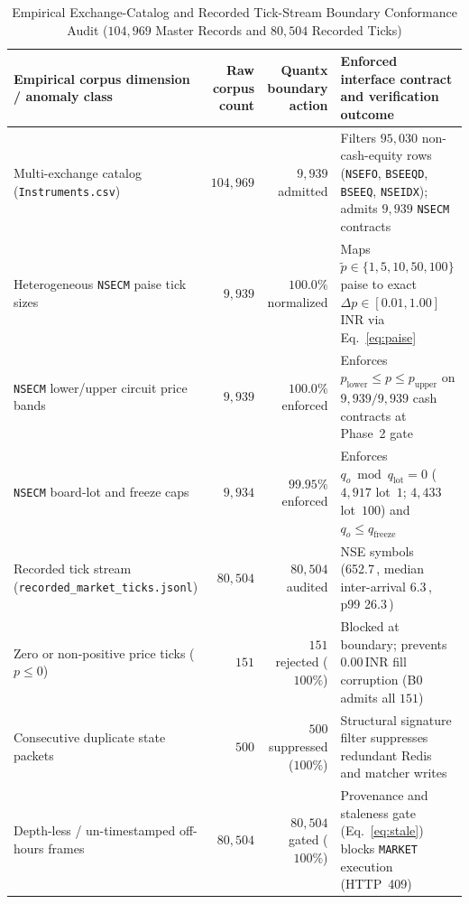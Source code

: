 \documentclass[12pt]{article}
\newcommand{\thinunit}[2]{#1\,\text{#2}}
\begin{document}
\begin{table}[!htbp]\begin{singlespace}
\caption{Empirical Exchange-Catalog and Recorded Tick-Stream Boundary Conformance Audit ($104{,}969$ Master Records and $80{,}504$ Recorded Ticks)}
\label{tab:realdata}
\centering
\small
\renewcommand{\arraystretch}{1.12}
\begin{tabularx}{\textwidth}{@{}>{\raggedright\arraybackslash}p{2.35in} r r >{\raggedright\arraybackslash}X@{}}
\toprule
Empirical corpus dimension / anomaly class & Raw corpus count & Quantx boundary action & Enforced interface contract and verification outcome \\
\midrule
Multi-exchange catalog (\texttt{Instruments.csv}) & $104{,}969$ & $9{,}939$ admitted & Filters $95{,}030$ non-cash-equity rows (\texttt{NSEFO}, \texttt{BSEEQD}, \texttt{BSEEQ}, \texttt{NSEIDX}); admits $9{,}939$ \texttt{NSECM} contracts \\
Heterogeneous \texttt{NSECM} paise tick sizes & $9{,}939$ & $100.0\%$ normalized & Maps $\tilde{p}\in\{1,5,10,50,100\}$ paise to exact $\Delta p\in[0.01,1.00]$ INR via Eq.~\eqref{eq:paise} \\
\texttt{NSECM} lower/upper circuit price bands & $9{,}939$ & $100.0\%$ enforced & Enforces $p_{\mathrm{lower}}\le p\le p_{\mathrm{upper}}$ on $9{,}939/9{,}939$ cash contracts at Phase~2 gate \\
\texttt{NSECM} board-lot and freeze caps & $9{,}934$ & $99.95\%$ enforced & Enforces $q_o\bmod q_{\mathrm{lot}}=0$ ($4{,}917$ lot~$1$; $4{,}433$ lot~$100$) and $q_o\le q_{\mathrm{freeze}}$ \\
Recorded tick stream (\texttt{recorded\_market\_ticks.jsonl}) & $80{,}504$ & $80{,}504$ audited & 100 NSE symbols (\thinunit{652.7}{s}, median inter-arrival \thinunit{6.3}{ms}, p99 \thinunit{26.3}{ms}) \\
Zero or non-positive price ticks ($p \le 0$) & $151$ & $151$ rejected ($100\%$) & Blocked at boundary; prevents $\thinunit{0.00}{INR}$ fill corruption (B0 admits all $151$) \\
Consecutive duplicate state packets & $500$ & $500$ suppressed ($100\%$) & Structural signature filter suppresses redundant Redis and matcher writes \\
Depth-less / un-timestamped off-hours frames & $80{,}504$ & $80{,}504$ gated ($100\%$) & Provenance and staleness gate (Eq.~\eqref{eq:stale}) blocks \texttt{MARKET} execution (HTTP~409) \\
\bottomrule
\end{tabularx}
\end{singlespace}\end{table}
\end{document}
